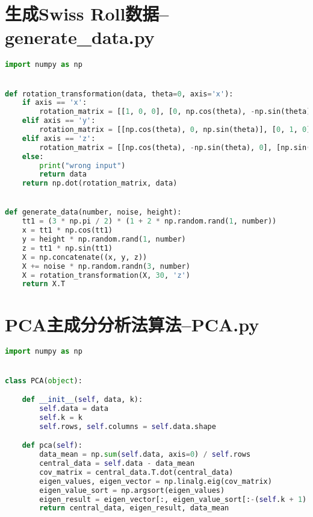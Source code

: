 \documentclass{hitreport}
\begin{document}
\newpage
\begin{appendices}

\section{生成Swiss Roll数据--generate\_data.py}\label{app:Swiss Roll}
\begin{lstlisting}[language=python]
import numpy as np


def rotation_transformation(data, theta=0, axis='x'):
    if axis == 'x':
        rotation_matrix = [[1, 0, 0], [0, np.cos(theta), -np.sin(theta)], [0, np.sin(theta), np.cos(theta)]]
    elif axis == 'y':
        rotation_matrix = [[np.cos(theta), 0, np.sin(theta)], [0, 1, 0], [-np.sin(theta), 0, np.cos(theta)]]
    elif axis == 'z':
        rotation_matrix = [[np.cos(theta), -np.sin(theta), 0], [np.sin(theta), np.cos(theta), 0], [0, 0, 1]]
    else:
        print("wrong input")
        return data
    return np.dot(rotation_matrix, data)


def generate_data(number, noise, height):
    tt1 = (3 * np.pi / 2) * (1 + 2 * np.random.rand(1, number))
    x = tt1 * np.cos(tt1)
    y = height * np.random.rand(1, number)
    z = tt1 * np.sin(tt1)
    X = np.concatenate((x, y, z))
    X += noise * np.random.randn(3, number)
    X = rotation_transformation(X, 30, 'z')
    return X.T

\end{lstlisting}

\section{PCA主成分分析法算法--PCA.py}\label{app:gmm}
\begin{lstlisting}[language=python]
import numpy as np


class PCA(object):

    def __init__(self, data, k):
        self.data = data
        self.k = k
        self.rows, self.columns = self.data.shape

    def pca(self):
        data_mean = np.sum(self.data, axis=0) / self.rows
        central_data = self.data - data_mean
        cov_matrix = central_data.T.dot(central_data)
        eigen_values, eigen_vector = np.linalg.eig(cov_matrix)
        eigen_value_sort = np.argsort(eigen_values)
        eigen_result = eigen_vector[:, eigen_value_sort[:-(self.k + 1):-1]]
        return central_data, eigen_result, data_mean

\end{lstlisting}


\end{appendices}
\end{document}
